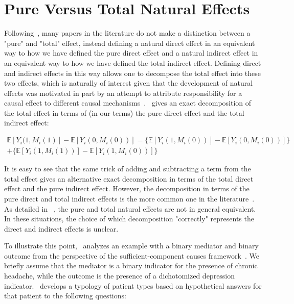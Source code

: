 \section{Pure Versus Total Natural Effects}\label{subsection:pure_total_natural_effects}

Following~\cite{pearl2001}, many papers in the literature do not make a distinction between a "pure" and "total"
effect, instead defining a natural direct effect in an equivalent way to how we have defined the 
pure direct effect and a natural indirect effect in an equivalent way to how we have defined the total indirect effect.
Defining direct and indirect effects in this way allows one to decompose the total effect into these two effects, which
is naturally of interest given that the development of natural effects was motivated in part by an attempt to attribute 
responsibility for a causal effect to different causal mechanisms~\citep{pearl2001}.~\cite{pearl2001} gives an exact 
decomposition of the total effect in terms of (in our terms) the pure direct effect and the total indirect effect:

\begin{equation}
\begin{aligned}
	\mathbb{E}[Y_{i}(1,M_{i}(1)] - \mathbb{E}[Y_{i}(0,M_{i}(0))] = 
	\{\mathbb{E}[Y_{i}(1,M_{i}(0))] - \mathbb{E}[Y_{i}(0,M_{i}(0))]\}\\ 
	+ \{\mathbb{E}[Y_{i}(1,M_{i}(1))] - \mathbb{E}[Y_{i}(1,M_{i}(0))]\}
\end{aligned}
\end{equation}

It is easy to see that the same trick of adding and subtracting a term from the total effect gives an alternative
exact decomposition in terms of the total direct effect and the pure indirect effect. However, the decomposition
in terms of the pure direct and total indirect effects is the more common one in the literature~\citep{vanderweele2014}. 
As detailed in
~\cite{robinsgreenland1992}, the pure and total natural effects are not in general equivalent. In these situations, 
the choice of which decomposition "correctly" represents the direct and indirect effects is unclear.

To illustrate this point,~\cite{robinsgreenland1992} analyzes an example with a binary mediator and binary
outcome from the perspective of the sufficient-component causes framework~\citep{rothman1976}. We briefly assume 
that the mediator is a binary indicator for the presence of chronic headache, while
the outcome is the presence of a dichotomized depression indicator.~\cite{robinsgreenland1992} develops a typology
of patient types based on hypothetical answers for that patient to the following questions:


